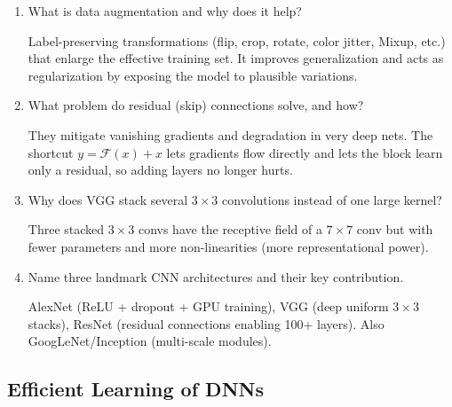 \documentclass[10pt,a4paper]{article}
\newcommand{\q}[1]{\item #1}
\begin{document}
\begin{enumerate}[leftmargin=*,label=\textbf{Q\arabic*.}]

\q What is data augmentation and why does it help?
\begin{answerbox}
Label-preserving transformations (flip, crop, rotate, color jitter, Mixup, etc.) that enlarge the effective training set. It improves generalization and acts as regularization by exposing the model to plausible variations.
\end{answerbox}

\q What problem do residual (skip) connections solve, and how?
\begin{answerbox}
They mitigate vanishing gradients and degradation in very deep nets. The shortcut $y = \mathcal{F}(x)+x$ lets gradients flow directly and lets the block learn only a residual, so adding layers no longer hurts.
\end{answerbox}

\q Why does VGG stack several $3\times3$ convolutions instead of one large kernel?
\begin{answerbox}
Three stacked $3\times3$ convs have the receptive field of a $7\times7$ conv but with fewer parameters and more non-linearities (more representational power).
\end{answerbox}

\q Name three landmark CNN architectures and their key contribution.
\begin{answerbox}
AlexNet (ReLU + dropout + GPU training), VGG (deep uniform $3\times3$ stacks), ResNet (residual connections enabling 100+ layers). Also GoogLeNet/Inception (multi-scale modules).
\end{answerbox}

\end{enumerate}

\subsection{Efficient Learning of DNNs}
\end{document}
